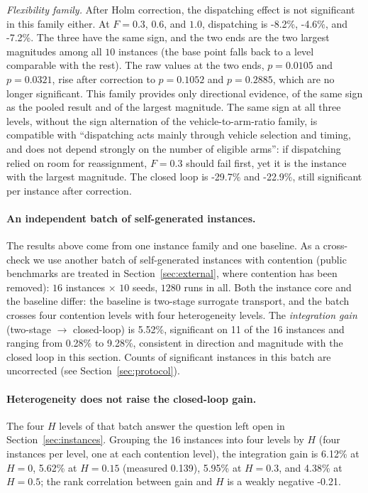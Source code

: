 \documentclass[manuscript,screen,review]{acmart}
\newcommand{\NCases}{10}
\newcommand{\GainProbeFleetBase}{-4.6\%} %
\newcommand{\GainLoopFlexLo}{-29.7\%}    %
\newcommand{\GainLoopFlexHi}{-22.9\%}    %
\newcommand{\GainProbeFlexLo}{-8.2\%}    %
\newcommand{\GainProbeFlexHi}{-7.2\%}    %
\newcommand{\PProbeFlexLoRaw}{=0.0105}
\newcommand{\PProbeFlexLoHolm}{=0.1052}
\newcommand{\PProbeFlexHiRaw}{=0.0321}
\newcommand{\PProbeFlexHiHolm}{=0.2885}
\newcommand{\MatrixCells}{16}
\newcommand{\MatrixRuns}{1280}
\newcommand{\GainIntegMatrix}{5.52\%}    %
\newcommand{\SigIntegMatrix}{11}         %
\newcommand{\GainIntegMatrixLo}{0.28\%}
\newcommand{\GainIntegMatrixHi}{9.28\%}
\newcommand{\GainIntegHZero}{6.12\%}
\newcommand{\GainIntegHLow}{5.62\%}      %
\newcommand{\GainIntegHMid}{5.95\%}      %
\newcommand{\GainIntegHHigh}{4.38\%}     %
\newcommand{\MatrixHMeasLow}{0.139}      %
\newcommand{\RhoIntegH}{-0.21}           %
\begin{document}
\emph{Flexibility family.}
After Holm correction, the dispatching effect is not significant in this family either.
At $F=0.3$, $0.6$, and $1.0$, dispatching is \GainProbeFlexLo{}, \GainProbeFleetBase{}, and \GainProbeFlexHi{}. The three have the same sign, and the two ends are the two largest magnitudes among all $\NCases$ instances (the base point falls back to a level comparable with the rest). The raw values at the two ends, $p\PProbeFlexLoRaw$ and $p\PProbeFlexHiRaw$, rise after correction to $p\PProbeFlexLoHolm$ and $p\PProbeFlexHiHolm$, which are no longer significant.
This family provides only directional evidence, of the same sign as the pooled result and of the largest magnitude.
The same sign at all three levels, without the sign alternation of the vehicle-to-arm-ratio family, is compatible with ``dispatching acts mainly through vehicle selection and timing, and does not depend strongly on the number of eligible arms'': if dispatching relied on room for reassignment, $F=0.3$ should fail first, yet it is the instance with the largest magnitude.
The closed loop is \GainLoopFlexLo{} and \GainLoopFlexHi{}, still significant per instance after correction.

\paragraph{An independent batch of self-generated instances.}
The results above come from one instance family and one baseline. As a cross-check we use another batch of self-generated instances with contention (public benchmarks are treated in Section~\ref{sec:external}, where contention has been removed): $\MatrixCells$ instances $\times$ $10$ seeds, $\MatrixRuns$ runs in all.
Both the instance core and the baseline differ: the baseline is two-stage surrogate transport, and the batch crosses four contention levels with four heterogeneity levels.
The \emph{integration gain} (two-stage $\to$ closed-loop) is \GainIntegMatrix{}, significant on \SigIntegMatrix{} of the $\MatrixCells$ instances and ranging from \GainIntegMatrixLo{} to \GainIntegMatrixHi{}, consistent in direction and magnitude with the closed loop in this section.
Counts of significant instances in this batch are uncorrected (see Section~\ref{sec:protocol}).

\paragraph{Heterogeneity does not raise the closed-loop gain.}
The four $H$ levels of that batch answer the question left open in Section~\ref{sec:instances}. Grouping the $\MatrixCells$ instances into four levels by $H$ (four instances per level, one at each contention level), the integration gain is \GainIntegHZero{} at $H=0$, \GainIntegHLow{} at $H=0.15$ (measured \MatrixHMeasLow{}), \GainIntegHMid{} at $H=0.3$, and \GainIntegHHigh{} at $H=0.5$; the rank correlation between gain and $H$ is a weakly negative \RhoIntegH{}.
\end{document}
